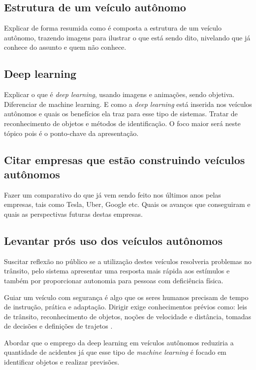 \documentclass[12pt,a4paper]{article}
\begin{document}
    \subsection{Estrutura de um veículo autônomo}
    \par Explicar de forma resumida como é composta a estrutura de um veículo autônomo, trazendo imagens para ilustrar o que está sendo dito, nivelando que já conhece do assunto e quem não conhece. 

    \subsection{Deep learning}
    \par Explicar o que é \emph{deep learning}, usando imagens e animações, sendo objetiva. Diferenciar de machine learning. E como a \emph{deep learning} está inserida nos veículos autônomos e quais os benefícios ela traz para esse tipo de sistemas. Tratar de reconhecimento de objetos e métodos de identificação. O foco maior será neste tópico pois é o ponto-chave da apresentação.

    \subsection{Citar empresas que estão construindo veículos autônomos}
    \par Fazer um comparativo do que já vem sendo feito nos últimos anos pelas empresas, tais como Tesla, Uber, Google etc. Quais os avanços que conseguiram e quais as perspectivas futuras destas empresas.

    \subsection{Levantar prós uso dos veículos autônomos}
    \par Suscitar reflexão no público se a utilização destes veículos resolveria problemas no trânsito, pelo sistema apresentar uma resposta mais rápida aos estímulos e também por proporcionar autonomia para pessoas com deficiência física.
    \par Guiar um veículo com segurança é algo que os seres humanos precisam de tempo de instrução, prática e adaptação. Dirigir exige conhecimentos prévios como: leis de trânsito, reconhecimento de objetos, noções de velocidade e distância, tomadas de decisões e definições de trajetos \cite{1}. 
    \par Abordar que o emprego da deep learning em veículos autônomos reduziria a quantidade de acidentes já que esse tipo de \emph{machine learning} é focado em identificar objetos e realizar previsões.
\end{document}
